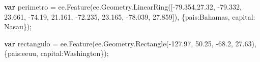 \documentclass[
  12pt,
  letterpaper,
  twoside]{book}
\newenvironment{Shaded}{\begin{snugshade}}{\end{snugshade}}
\newcommand{\AttributeTok}[1]{\textcolor[rgb]{0.48,0.12,0.64}{#1}}
\newcommand{\DataTypeTok}[1]{\textcolor[rgb]{0.00,0.00,0.00}{#1}}
\newcommand{\FloatTok}[1]{\textcolor[rgb]{0.28,0.53,0.93}{#1}}
\newcommand{\FunctionTok}[1]{\textcolor[rgb]{0.48,0.12,0.64}{#1}}
\newcommand{\KeywordTok}[1]{\textcolor[rgb]{0.00,0.00,0.00}{\textbf{#1}}}
\newcommand{\NormalTok}[1]{#1}
\newcommand{\OperatorTok}[1]{\textcolor[rgb]{0.00,0.00,0.00}{#1}}
\newcommand{\StringTok}[1]{\textcolor[rgb]{0.87,0.29,0.22}{#1}}
\begin{document}
\begin{Shaded}
\begin{Highlighting}[]
\KeywordTok{var}\NormalTok{ perimetro }\OperatorTok{=}\NormalTok{ ee}\OperatorTok{.}\FunctionTok{Feature}\NormalTok{(ee}\OperatorTok{.}\AttributeTok{Geometry}\OperatorTok{.}\FunctionTok{LinearRing}\NormalTok{([}\OperatorTok{{-}}\FloatTok{79.354}\OperatorTok{,}\FloatTok{27.32}\OperatorTok{,}
                                   \OperatorTok{{-}}\FloatTok{79.332}\OperatorTok{,} \FloatTok{23.661}\OperatorTok{,}
                                   \OperatorTok{{-}}\FloatTok{74.19}\OperatorTok{,} \FloatTok{21.161}\OperatorTok{,}
                                 \OperatorTok{{-}}\FloatTok{72.235}\OperatorTok{,} \FloatTok{23.165}\OperatorTok{,}
                                   \OperatorTok{{-}}\FloatTok{78.039}\OperatorTok{,} \FloatTok{27.859}\NormalTok{])}\OperatorTok{,}
\NormalTok{        \{}\DataTypeTok{pais}\OperatorTok{:}\StringTok{\textquotesingle{}Bahamas\textquotesingle{}}\OperatorTok{,}
      \DataTypeTok{capital}\OperatorTok{:} \StringTok{\textquotesingle{}Nasau\textquotesingle{}}\NormalTok{\})}\OperatorTok{;}

\KeywordTok{var}\NormalTok{ rectangulo }\OperatorTok{=}\NormalTok{ ee}\OperatorTok{.}\FunctionTok{Feature}\NormalTok{(ee}\OperatorTok{.}\AttributeTok{Geometry}\OperatorTok{.}\FunctionTok{Rectangle}\NormalTok{(}\OperatorTok{{-}}\FloatTok{127.97}\OperatorTok{,} \FloatTok{50.25}\OperatorTok{,}
                                  \OperatorTok{{-}}\FloatTok{68.2}\OperatorTok{,} \FloatTok{27.63}\NormalTok{)}\OperatorTok{,}
\NormalTok{        \{}\DataTypeTok{pais}\OperatorTok{:}\StringTok{\textquotesingle{}eeuu\textquotesingle{}}\OperatorTok{,} 
      \DataTypeTok{capital}\OperatorTok{:}\StringTok{\textquotesingle{}Washington\textquotesingle{}}\NormalTok{\})}\OperatorTok{;} 


\end{Highlighting}
\end{Shaded}
\end{document}
